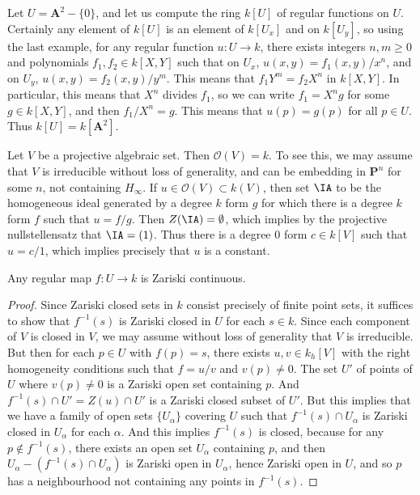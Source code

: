 \begin{example}
    Let $U = \mathbf{A}^2 - \{ 0 \}$, and let us compute the ring $k[U]$ of regular functions on $U$. Certainly any element of $k[U]$ is an element of $k[U_x]$ and on $k[U_y]$, so using the last example, for any regular function $u: U \to k$, there exists integers $n,m \geq 0$ and polynomials $f_1,f_2 \in k[X,Y]$ such that on $U_x$, $u(x,y) = f_1(x,y)/x^n$, and on $U_y$, $u(x,y) = f_2(x,y)/y^m$. This means that $f_1 Y^m = f_2 X^n$ in $k[X,Y]$. In particular, this means that $X^n$ divides $f_1$, so we can write $f_1 = X^n g$ for some $g \in k[X,Y]$, and then $f_1/X^n = g$. This means that $u(p) = g(p)$ for all $p \in U$. Thus $k[U] = k[\mathbf{A}^2]$.
\end{example}

\begin{example}
    Let $V$ be a projective algebraic set. Then $\mathcal{O}(V) = k$. To see this, we may assume that $V$ is irreducible without loss of generality, and can be embedding in $\mathbf{P}^n$ for some $n$, not containing $H_\infty$. If $u \in \mathcal{O}(V) \subset k(V)$, then set $\IA$ to be the homogeneous ideal generated by a degree $k$ form $g$ for which there is a degree $k$ form $f$ such that $u = f/g$. Then $Z(\IA) = \emptyset$, which implies by the projective nullstellensatz that $\IA = (1)$. Thus there is a degree 0 form $c \in k[V]$ such that $u = c/1$, which implies precisely that $u$ is a constant.
\end{example}

\begin{theorem}
    Any regular map $f: U \to k$ is Zariski continuous.
\end{theorem}
\begin{proof}
    Since Zariski closed sets in $k$ consist precisely of finite point sets, it suffices to show that $f^{-1}(s)$ is Zariski closed in $U$ for each $s \in k$. Since each component of $V$ is closed in $V$, we may assume without loss of generality that $V$ is irreducible. But then for each $p \in U$ with $f(p) = s$, there exists $u,v \in k_h[V]$ with the right homogeneity conditions such that $f = u/v$ and $v(p) \neq 0$. The set $U'$ of points of $U$ where $v(p) \neq 0$ is a Zariski open set containing $p$. And $f^{-1}(s) \cap U' = Z(u) \cap U'$ is a Zariski closed subset of $U'$. But this implies that we have a family of open sets $\{ U_\alpha \}$ covering $U$ such that $f^{-1}(s) \cap U_\alpha$ is Zariski closed in $U_\alpha$ for each $\alpha$. And this implies $f^{-1}(s)$ is closed, because for any $p \not \in f^{-1}(s)$, there exists an open set $U_\alpha$ containing $p$, and then $U_\alpha - (f^{-1}(s) \cap U_\alpha)$ is Zariski open in $U_\alpha$, hence Zariski open in $U$, and so $p$ has a neighbourhood not containing any points in $f^{-1}(s)$.
\end{proof}

